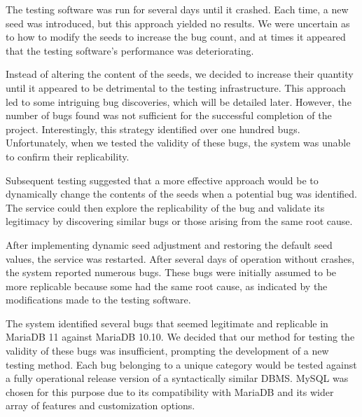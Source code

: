 \documentclass[sigconf]{acmart}
\begin{document}
The testing software was run for several days until it crashed. Each time, a new seed was introduced, but this approach yielded no results. We were uncertain as to how to modify the seeds to increase the bug count, and at times it appeared that the testing software's performance was deteriorating.

Instead of altering the content of the seeds, we decided to increase their quantity until it appeared to be detrimental to the testing infrastructure. This approach led to some intriguing bug discoveries, which will be detailed later. However, the number of bugs found was not sufficient for the successful completion of the project. Interestingly, this strategy identified over one hundred bugs. Unfortunately, when we tested the validity of these bugs, the system was unable to confirm their replicability.

Subsequent testing suggested that a more effective approach would be to dynamically change the contents of the seeds when a potential bug was identified. The service could then explore the replicability of the bug and validate its legitimacy by discovering similar bugs or those arising from the same root cause.

After implementing dynamic seed adjustment and restoring the default seed values, the service was restarted. After several days of operation without crashes, the system reported numerous bugs. These bugs were initially assumed to be more replicable because some had the same root cause, as indicated by the modifications made to the testing software.

The system identified several bugs that seemed legitimate and replicable in MariaDB 11 against MariaDB 10.10. We decided that our method for testing the validity of these bugs was insufficient, prompting the development of a new testing method. Each bug belonging to a unique category would be tested against a fully operational release version of a syntactically similar DBMS. MySQL was chosen for this purpose due to its compatibility with MariaDB and its wider array of features and customization options.
\end{document}
